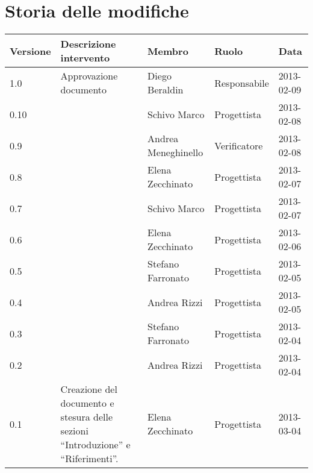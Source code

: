 





\section*{Storia delle modifiche}
\begin{center}
\begin{longtable}{lp{}lll}
\toprule
Versione & Descrizione intervento & Membro & Ruolo & Data\\
\midrule %
1.0 & Approvazione documento &Diego Beraldin &Responsabile  & 2013-02-09\\
0.10 & &Schivo Marco  &  Progettista& 2013-02-08\\
0.9 & &Andrea Meneghinello & Verificatore & 2013-02-08\\
0.8 &  & Elena Zecchinato &  Progettista& 2013-02-07\\
0.7 & &Schivo Marco &  Progettista& 2013-02-07\\
0.6 &  &Elena Zecchinato &  Progettista& 2013-02-06\\
0.5 &  &Stefano Farronato &  Progettista& 2013-02-05\\
0.4 &  &Andrea Rizzi &  Progettista& 2013-02-05\\
0.3 &  &Stefano Farronato &  Progettista& 2013-02-04\\
0.2 &  &Andrea Rizzi &  Progettista& 2013-02-04\\
0.1 & Creazione del documento e stesura delle sezioni ``Introduzione'' e ``Riferimenti''. &Elena Zecchinato &Progettista  & 2013-03-04\\
\bottomrule
\end{longtable}
\end{center}
\newpage



\setcounter{page}{1}
\pagestyle{normal}

\newpage

